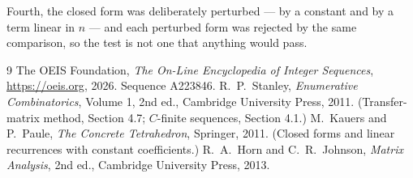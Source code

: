 \documentclass[11pt,a4paper]{article}
\theoremstyle{plain}
\theoremstyle{definition}
\begin{document}
Fourth, the closed form was deliberately perturbed --- by a constant and by a term linear in
$n$ --- and each perturbed form was rejected by the same comparison, so the test is not one
that anything would pass.

\begin{thebibliography}{9}
 The OEIS Foundation, \emph{The On-Line Encyclopedia of Integer
Sequences}, \url{https://oeis.org}, 2026. Sequence A223846.
 R.~P.~Stanley, \emph{Enumerative Combinatorics}, Volume 1, 2nd ed.,
Cambridge University Press, 2011. (Transfer-matrix method, Section 4.7; $C$-finite sequences,
Section 4.1.)
 M.~Kauers and P.~Paule, \emph{The Concrete Tetrahedron}, Springer, 2011.
(Closed forms and linear recurrences with constant coefficients.)
 R.~A.~Horn and C.~R.~Johnson, \emph{Matrix Analysis}, 2nd ed., Cambridge
University Press, 2013.
\end{thebibliography}
\end{document}
